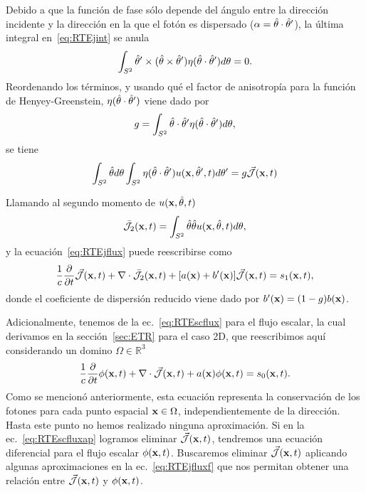 Debido a que la función de fase sólo depende del ángulo entre 
la dirección incidente y la dirección en la que el fotón es dispersado ($\alpha=\hat{\theta} \cdot \hat{\theta}'$), la última integral en~\eqref{eq:RTEjint} se anula
\begin{equation}
\begin{split}
\begin{aligned}
\int_{S^2}  \hat{\theta}' \times(\hat{\theta} \times \hat{\theta}') \eta(\hat{\theta} \cdot \hat{\theta}') d\theta =0.
\end{aligned}
\end{split}
\label{eq:RTEjint2}
\end{equation}
Reordenando los términos, y usando qué
el factor de anisotropía para la función de Henyey-Greenstein, $\eta(\hat{\theta} \cdot \hat{\theta}')$ viene dado por 
\begin{equation}
g=\int_{S^2} \hat{\theta} \cdot \hat{\theta}' \eta(\hat{\theta} \cdot \hat{\theta}') d\theta,
\label{eq:gnorm}
\end{equation}
se tiene 
\begin{equation}
\begin{split}
\begin{aligned}
\int_{S^2} \hat{\theta} d\theta \int_{S^2} \eta(\hat{\theta} \cdot \hat{\theta}')  u(\mathbf{x},\hat{\theta}',t) d\theta' 
=g \vec{ \mathcal{J}}(\mathbf{x},t)
\end{aligned}
\end{split}
\label{eq:RTEjint}
\end{equation}

Llamando al segundo momento de $u(\mathbf{x},\hat{\theta},t)$
\begin{equation}
\bar{\mathcal{J}}_2(\mathbf{x},t)=\int_{S^2} \hat{\theta} \hat{\theta} u(\mathbf{x},\hat{\theta},t) d\theta,
\label{eq:RTEjflux2}
\end{equation}
y la ecuación~\eqref{eq:RTEjflux} puede reescribirse como
\begin{equation}
\begin{split}
\begin{aligned}
\frac{1}{c}\frac{\partial}{\partial t} \vec{ \mathcal{J}}(\mathbf{x},t)+\nabla \cdot \bar{\mathcal{J}}_2(\mathbf{x},t)+[a(\mathbf{x})+b'(\mathbf{x})]\vec{ \mathcal{J}}(\mathbf{x},t)=s_1(\mathbf{x},t),
\end{aligned}
\end{split}
\label{eq:RTEjfluxf}
\end{equation}
donde el coeficiente de dispersión reducido viene dado por $b'(\mathbf{x})=(1-g)b(\mathbf{x})$.

Adicionalmente, tenemos de la ec.~\eqref{eq:RTEscflux} para el flujo escalar, la cual derivamos en la 
sección~\ref{sec:ETR} para el caso 2D, que reescribimos aquí considerando un domino $\Omega \in \mathbb{R}^3$
\begin{equation}
\frac{1}{c}\frac{\partial}{\partial t} \phi(\mathbf{x},t)+\nabla \cdot \vec{ \mathcal{J}}(\mathbf{x},t)
+a(\mathbf{x})\phi(\mathbf{x},t)=s_0(\mathbf{x},t).
\label{eq:RTEscfluxap}
\end{equation}
Como se mencionó anteriormente, esta ecuación representa la conservación 
de los fotones para cada punto espacial $\mathbf{x} \in \Omega$, independientemente 
de la dirección. Hasta este punto no hemos realizado ninguna aproximación. 
Si en la ec.~\eqref{eq:RTEscfluxap} logramos eliminar $\vec{ \mathcal{J}}(\mathbf{x},t)$, tendremos una ecuación diferencial 
para el flujo escalar $\phi(\mathbf{x},t)$. Buscaremos eliminar $\vec{ \mathcal{J}}(\mathbf{x},t)$ aplicando algunas aproximaciones en la ec.~\eqref{eq:RTEjfluxf} que nos permitan obtener una relación entre $\vec{ \mathcal{J}}(\mathbf{x},t)$ y $\phi(\mathbf{x},t)$.

